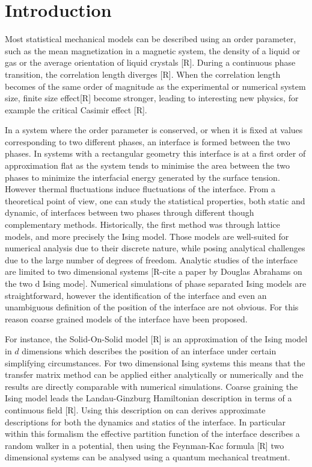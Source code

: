 \chapter*{Introduction}

Most statistical mechanical  models can be  described using an order parameter, such as the mean magnetization in a magnetic system, the density of a liquid or gas or the average orientation of liquid crystals [R]. During a continuous phase transition, the correlation length diverges [R]. When the correlation length becomes of the same order of magnitude as the experimental or numerical system size, finite size effect[R] become stronger, leading to interesting new physics, for example the  critical Casimir effect [R].

In a system where the order parameter is conserved, or when it is fixed at values corresponding to two different phases, an interface is formed between the two phases.
In systems with a rectangular geometry this interface is at a first order of approximation flat as the system tends to minimise the area between the two phases to minimize the interfacial energy generated by the surface tension. However thermal fluctuations induce fluctuations of the interface. From a theoretical point of view, one can study the statistical properties, both static and dynamic, of interfaces between two phases through different though complementary methods. Historically, the first method was through lattice models, and more precisely the Ising model. Those models are well-suited for numerical analysis due to their discrete nature, while posing analytical challenges due to the large number of degrees of freedom. Analytic studies of the interface are limited to two dimensional systems [R-cite a paper by Douglas Abrahams on the two d Ising mode]. Numerical simulations of phase separated Ising models are straightforward, however the identification of the interface and even an unambiguous definition of the position of the interface are not obvious. For this reason coarse grained models of the interface have been proposed.

For instance, the Solid-On-Solid model [R] is an approximation of the Ising model in $d$ dimensions which describes the position of an interface under certain simplifying circumstances. For two dimensional Ising systems this means that the transfer matrix method can be applied either analytically or numerically and the results are directly comparable with numerical simulations.
Coarse graining the Ising model leads the Landau-Ginzburg Hamiltonian description in terms of a continuous field [R]. Using this description on can derives approximate descriptions for both the dynamics and statics of the interface. In particular within this formalism the effective partition function of the interface describes a random walker in a potential, then using the Feynman-Kac formula [R] two dimensional systems can be analysed using a quantum mechanical treatment.

